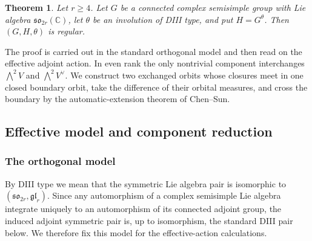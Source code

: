 \documentclass[11pt,reqno]{amsart}
\numberwithin{equation}{section}
\newtheorem{theorem}{Theorem}[section]
\theoremstyle{definition}
\theoremstyle{remark}
\newcommand{\C}{\mathbb C}
\begin{document}
\begin{theorem}\label{thm:DIII-main}
Let $r\ge4$.  Let $G$ be a connected complex semisimple group with Lie algebra
$\mathfrak{so}_{2r}(\C)$, let $\theta$ be an involution of DIII type, and put
$H=G^\theta$.  Then $(G,H,\theta)$ is regular.
\end{theorem}

The proof is carried out in the standard orthogonal model and then read on the
effective adjoint action.  In even rank the only nontrivial component interchanges
$\bigwedge^2V$ and $\bigwedge^2V^\vee$.  We construct two exchanged orbits whose
closures meet in one closed boundary orbit, take the difference of their orbital
measures, and cross the boundary by the automatic-extension theorem of
Chen--Sun.

\subsection{Effective model and component reduction}
\subsubsection{The orthogonal model}

By DIII type we mean that the symmetric Lie algebra pair is isomorphic to
$(\mathfrak{so}_{2r},\mathfrak{gl}_r)$.  Since any automorphism of a complex semisimple Lie algebra 
integrate uniquely to an automorphism of its connected adjoint group, the induced adjoint symmetric 
pair is, up to isomorphism, the standard DIII pair below.  We therefore fix this model for the 
effective-action calculations.
\end{document}
